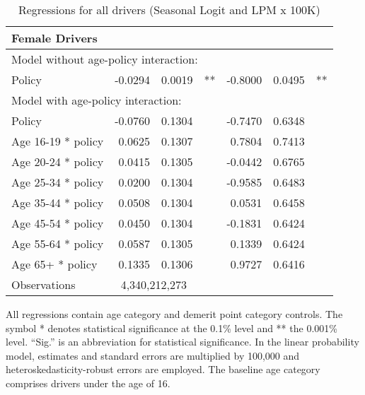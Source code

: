 \begin{table}
\begin{tabular}{l r r l r r l}
\hline 

\textbf{Female Drivers} \\ 

\hline
\multicolumn{7}{l}{Model without age-policy interaction: } \\ 
Policy                   &  -0.0294        &  0.0019       &   **       &  -0.8000        &  0.0495       &   **       \\ 
\hline
\multicolumn{7}{l}{Model with age-policy interaction: } \\ 
Policy                   &  -0.0760        &  0.1304       &            &  -0.7470        &  0.6348       &            \\ 
Age 16-19 * policy   &  0.0625        &  0.1307       &            &  0.7804        &  0.7413       &            \\ 
Age 20-24 * policy   &  0.0415        &  0.1305       &            &  -0.0442        &  0.6765       &            \\ 
Age 25-34 * policy   &  0.0200        &  0.1304       &            &  -0.9585        &  0.6483       &            \\ 
Age 35-44 * policy   &  0.0508        &  0.1304       &            &  0.0531        &  0.6458       &            \\ 
Age 45-54 * policy   &  0.0450        &  0.1304       &            &  -0.1831        &  0.6424       &            \\ 
Age 55-64 * policy   &  0.0587        &  0.1305       &            &  0.1339        &  0.6424       &            \\ 
Age 65+ * policy   &  0.1335        &  0.1306       &            &  0.9727        &  0.6416       &            \\ 
Observations & \multicolumn{2}{c}{4,340,212,273} \\ 


\hline 

\end{tabular} 
\caption{Regressions for all drivers (Seasonal Logit and LPM x 100K)} 
All regressions contain age category and demerit point category controls. 
The symbol * denotes statistical significance at the 0.1\% level 
and ** the 0.001\% level. 
``Sig.'' is an abbreviation for statistical significance. 
In the linear probability model, estimates and standard errors are multiplied by 100,000  
and heteroskedasticity-robust errors are employed. 
The baseline age category comprises drivers under the age of 16. 
\label{tab:seas_Logit_vs_LPMx100K_regs} 
\end{table} 
 
